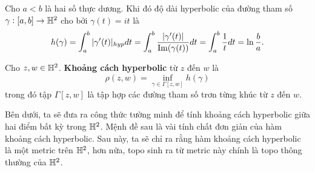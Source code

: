 \begin{exam*}
        Cho $a<b$ là hai số thực dương. Khi đó độ dài hyperbolic của đường tham số $\gamma:[a,b]\to \mathbb{H}^2$ cho bởi $\gamma(t) = it$ là
    \[h(\gamma) = \int_a^b|\gamma'(t)|_{hyp}dt = \int_a^b\dfrac{|\gamma'(t)|}{\operatorname{Im}(\gamma(t))}dt = \int_a^b\dfrac{1}{t}dt = \ln{\dfrac{b}{a}}.\]
            
\end{exam*}
\begin{defn}
    Cho $z,w\in \mathbb{H}^2$. \textbf{Khoảng cách hyperbolic} từ $z$ đến $w$ là 
    \[\rho(z,w) = \inf_{\gamma \in \Gamma[z,w]}{h(\gamma)}\]
    trong đó tập $\Gamma[z,w]$ là tập hợp các đường tham số trơn từng khúc từ $z$ đến $w$.
\end{defn}
Bên dưới, ta sẽ đưa ra công thức tường minh để tính khoảng cách hyperbolic giữa hai điểm bất kỳ trong $\mathbb{H}^2$. Mệnh đề sau là vài tính chất đơn giản của hàm khoảng cách hyperbolic. Sau này, ta sẽ chỉ ra rằng hàm khoảng cách hyperbolic là một metric trên $\mathbb{H}^2$, hơn nữa, topo sinh ra từ metric này chính là topo thông thường của $\mathbb{H}^2$. 

